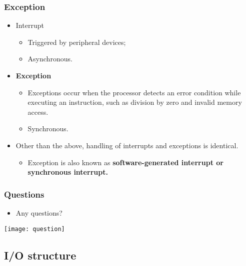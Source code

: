 \documentclass[CJKutf8,dvipsnames,table]{beamer}
\begin{document}
\begin{CJK*}{UTF8}{song}
  \begin{frame}
    \frametitle{Exception} \pause
    \begin{itemize}
    \item Interrupt  \pause
      \begin{itemize}
      \item Triggered by peripheral devices;  \pause
      \item Asynchronous.  \pause
      \end{itemize}
    \item \textbf{Exception}  \pause
      \begin{itemize}
      \item Exceptions occur when the processor detects an error condition while executing an instruction, such as division by zero and invalid memory access.  \pause
      \item Synchronous.  \pause
      \end{itemize}
    \item Other than the above, handling of interrupts and exceptions is identical.  \pause
      \begin{itemize}
      \item Exception is also known as \textbf{software-generated interrupt 
        or \textbf{synchronous interrupt}.}
      \end{itemize}
    \end{itemize}
  \end{frame}

  \begin{frame}
    \frametitle{Questions}
    \begin{itemize}
    \item Any questions? 
    \end{itemize}
    \begin{center}
      \texttt{[image: question]}
    \end{center}
  \end{frame}

  \subsection{I/O structure}

\iffalse


\end{CJK*}
\end{document}
